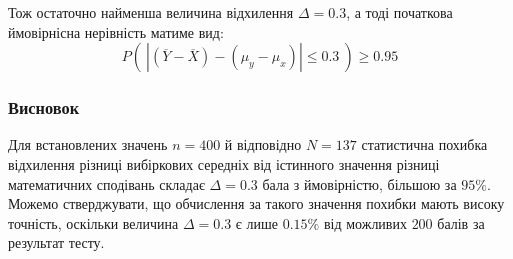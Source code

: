 Тож остаточно найменша величина відхилення $\Delta = 0.3$, а тоді початкова ймовірнісна нерівність матиме вид:
\begin{equation*}
    P\left(\ \left| (\overline{Y}-\overline{X})-(\mu_y-\mu_x) \right| \leqslant 0.3\ \right)\geqslant 0.95
\end{equation*}

\subsubsection{Висновок}

Для встановлених значень $n=400$ й відповідно $N=137$ статистична похибка відхилення різниці вибіркових 
середніх від істинного значення різниці математичних сподівань складає $\Delta = 0.3$ бала з ймовірністю, 
більшою за $95\%$. Можемо стверджувати, що обчислення за такого значення похибки мають високу точність, 
оскільки величина $\Delta = 0.3$ є лише $0.15\%$ від можливих $200$ балів за результат тесту.
